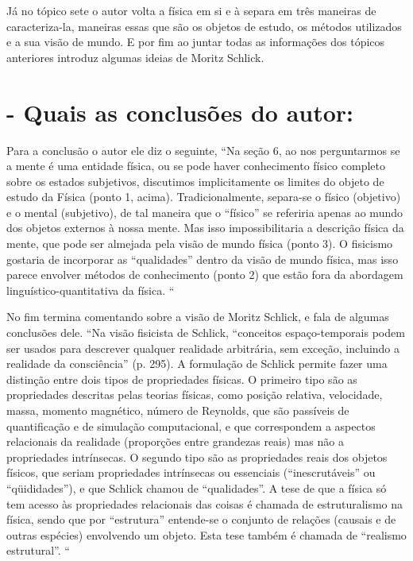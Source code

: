 \documentclass [a4paper, 12pt]{article}
\begin{document}
Já no tópico sete o autor volta a física em si e à separa em três maneiras de caracteriza-la, maneiras essas que são os objetos de estudo, os métodos utilizados e a sua visão de mundo. E por fim ao juntar todas as informações dos tópicos anteriores introduz algumas ideias de Moritz Schlick. 


\section*{- Quais as conclusões do autor:}

Para a conclusão o autor ele diz o seguinte, “Na seção 6, ao nos perguntarmos se a mente é uma entidade física, ou se pode haver conhecimento físico completo sobre os estados subjetivos, discutimos implicitamente os limites do objeto de estudo da Física (ponto 1, acima). Tradicionalmente, separa-se o físico (objetivo) e o mental (subjetivo), de tal maneira que o “físico” se referiria apenas ao mundo dos objetos externos à nossa mente. Mas isso impossibilitaria a descrição física da mente, que pode ser almejada pela visão de mundo física (ponto 3). O fisicismo gostaria de incorporar as “qualidades” dentro da visão de mundo física, mas isso parece envolver métodos de conhecimento (ponto 2) que estão fora da abordagem linguístico-quantitativa da física. “ 

No fim termina comentando sobre a visão de Moritz Schlick, e fala de algumas conclusões dele. “Na visão fisicista de Schlick, “conceitos espaço-temporais podem ser usados para descrever qualquer realidade arbitrária, sem exceção, incluindo a realidade da consciência” (p. 295). A formulação de Schlick permite fazer uma distinção entre dois tipos de propriedades físicas. O primeiro tipo são as propriedades descritas pelas teorias físicas, como posição relativa, velocidade, massa, momento magnético, número de Reynolds, que são passíveis de quantificação e de simulação computacional, e que correspondem a aspectos relacionais da realidade (proporções entre grandezas reais) mas não a propriedades intrínsecas. O segundo tipo são as propriedades reais dos objetos físicos, que seriam propriedades intrínsecas ou essenciais (“inescrutáveis” ou “qüididades”), e que Schlick chamou de “qualidades”. A tese de que a física só tem acesso às propriedades relacionais das coisas é chamada de estruturalismo na física, sendo que por “estrutura” entende-se o conjunto de relações (causais e de outras espécies) envolvendo um objeto. Esta tese também é chamada de “realismo estrutural”. “
\end{document}
